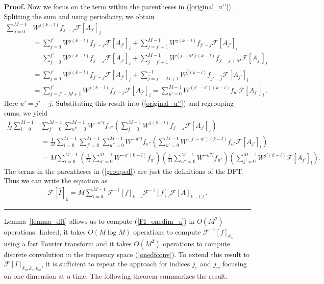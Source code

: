 \documentclass[12pt]{CSUNthesis}
\newenvironment{proof}[1][Proof]{\noindent\textbf{#1.} }{\newline \hspace*{\textwidth}\hspace*{-0,4cm} \rule{0.5em}{0.5em} \vspace{0,2cm}}
\def\calF{\mathcal{F}}
\begin{document}
\begin{proof}
Now we focus on the term within the parentheses in (\ref{original_u''}). Splitting the sum and using periodicity, we obtain
\begin{align}
\sum_{j=0}^{M-1}& W^{j(k-l)} f_{j'-j} \calF[A_{j'}]_{l} \\
&=\sum_{j=0}^{j'} W^{j(k-l)} f_{j'-j} \calF[A_{j'}]_{l} + \sum_{j=j'+1}^{M-1} W^{j(k-l)} f_{j'-j} \calF[A_{j'}]_{l}  \nonumber \\
&=\sum_{j=0}^{j'} W^{j(k-l)} f_{j'-j} \calF[A_{j'}]_{l} + \sum_{j=j'+1}^{M-1} W^{(j-M)(k-l)} f_{j'-j+M} \calF[A_{j'}]_{l}  \nonumber \\
&=\sum_{j=0}^{j'} W^{j(k-l)} f_{j'-j} \calF[A_{j'}]_{l} + \sum_{\hat{j}=j'-M+1}^{-1} W^{\hat{j}(k-l)} f_{j'-\hat{j}} \calF[A_{j'}]_{l}  \nonumber  \\
&=\sum_{j=j'-M+1}^{j'} W^{j(k-l)} f_{j'-j} \calF[A_{j'}]_{l} 
= \sum_{u'=0}^{M-1} W^{(j'-u')(k-l)} f_{u'} \calF[A_{j'}]_{l}\, .
\end{align}
Here $u'=j'-j$. 
Substituting this result into (\ref{original_u''}) and regrouping sums, we yield
\begin{align}
\label{grouped}
\frac{1}{M} \sum_{l=0}^{M-1} &\sum_{j'=0}^{M-1} \sum_{u''=0}^{M-1} W^{-u'' l }f_{u''} \left( \sum_{j=0}^{M-1} W^{j(k-l)} f_{j'-j}  \calF[A_{j'}]_{l}  \right) \nonumber \\
&= \frac{1}{M} \sum_{l=0}^{M-1} \sum_{j'=0}^{M-1} \sum_{u''=0}^{M-1} W^{-u'' l}f_{u''} \left(\sum_{u'=0}^{M-1} W^{(j'-u')(k-l)} f_{u'} \calF[A_{j'}]_{l} \right) \nonumber \\
&= M\sum_{l=0}^{M-1} \left( \frac{1}{M} \sum_{u'=0}^{M-1} W^{-u'(k-l)} f_{u'}  \right) \left( \frac{1}{M} \sum_{u''=0}^{M-1} W^{-u'' l} f_{u''} \right) \left(  \sum_{j'=0}^{M-1} W^{j'(k-l)} \calF[A_{j'}]_{l} \right).
\end{align}
The terms in the parentheses in (\ref{grouped}) are just the definitions of the DFT. Thus we can write the equation as
\begin{align*}
\calF [\hat{I}]_k = M \sum_{l=0}^{M-1} \calF^{-1}[f]_{k-l} \calF^{-1}[f]_l \calF[A]_{k-l,l} \, .
\end{align*}
\end{proof}

Lemma~\ref{lemma_dft} allows us to compute (\ref{FI_onedim_u}) in $O(M^2)$ operations. Indeed, it takes 
$O(M \log M)$ operations to compute $\calF^{-1}[f]_{k_{u}}$ using a fast Fourier transform and it takes 
$O(M^2)$ operations to compute discrete convolution in the frequency space (\ref{onedfconv}). To extend this result to $\calF[I]_{k_{u},k_{v},k_{w}}$, it is sufficient to repeat the approach for indices $j_{v}$ and $j_{w}$ focusing on one dimension at a time. The following theorem summarizes the result. 
\end{document}
